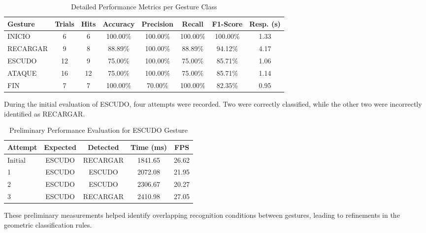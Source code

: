 \documentclass[lettersize,journal]{IEEEtran}
\begin{document}
	\begin{table}[!t]
		\centering
		\caption{Detailed Performance Metrics per Gesture Class}
		\label{tab:gesture_benchmark}
		\scriptsize
		\setlength{\tabcolsep}{3pt}
		\renewcommand{\arraystretch}{1.1}
		\begin{tabularx}{\columnwidth}{@{}l c c c c c c c@{}}
			\toprule
			\textbf{Gesture} & \textbf{Trials} & \textbf{Hits} & \textbf{Accuracy} & \textbf{Precision} & \textbf{Recall} & \textbf{F1-Score} & \textbf{Resp. (s)} \\
			\midrule
			INICIO   & 6  & 6  & 100.00\% & 100.00\% & 100.00\% & 100.00\% & 1.33 \\
			RECARGAR & 9  & 8  & 88.89\%  & 100.00\% & 88.89\%  & 94.12\%  & 4.17 \\
			ESCUDO   & 12 & 9  & 75.00\%  & 100.00\% & 75.00\%  & 85.71\%  & 1.06 \\
			ATAQUE   & 16 & 12 & 75.00\%  & 100.00\% & 75.00\%  & 85.71\%  & 1.14 \\
			FIN      & 7  & 7  & 100.00\% & 70.00\%  & 100.00\% & 82.35\%  & 0.95 \\
			\bottomrule
		\end{tabularx}
	\end{table}
	
	During the initial evaluation of ESCUDO, four attempts were recorded. Two were correctly classified, while the other two were incorrectly identified as RECARGAR.
	
	\begin{table}[!t]
		\centering
		\caption{Preliminary Performance Evaluation for ESCUDO Gesture}
		\label{tab:escudo_performance}
		\scriptsize
		\setlength{\tabcolsep}{3pt}
		\renewcommand{\arraystretch}{1.1}
		\begin{tabularx}{\columnwidth}{@{}l c c c c@{}}
			\toprule
			\textbf{Attempt} & \textbf{Expected} & \textbf{Detected} & \textbf{Time (ms)} & \textbf{FPS} \\
			\midrule
			Initial & ESCUDO & RECARGAR & 1841.65 & 26.62 \\
			1       & ESCUDO & ESCUDO   & 2072.08 & 21.95 \\
			2       & ESCUDO & ESCUDO   & 2306.67 & 20.27 \\
			3       & ESCUDO & RECARGAR & 2410.98 & 27.05 \\
			\bottomrule
		\end{tabularx}
	\end{table}
	
	These preliminary measurements helped identify overlapping recognition conditions between gestures, leading to refinements in the geometric classification rules.
	
\end{document}
